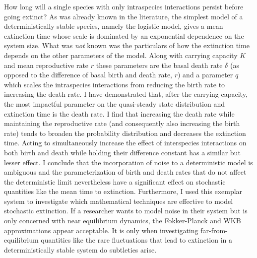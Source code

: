 How long will a single species with only intraspecies interactions persist before going extinct? 
As was already known in the literature, the simplest model of a deterministically stable species, namely the logistic model, gives a mean extinction time whose scale is dominated by an exponential dependence on the system size. 
What was \emph{not} known was the particulars of how the extinction time depends on the other parameters of the model. %
Along with carrying capacity $K$ and mean reproductive rate $r$ these parameters are the basal death rate $\delta$ (as opposed to the difference of basal birth and death rate, $r$) and a parameter $q$ which scales the intraspecies interactions from reducing the birth rate to increasing the death rate. 
I have demonstrated that, after the carrying capacity, the most impactful parameter on the quasi-steady state distribution and extinction time is the death rate. 
I find that increasing the death rate while maintaining the reproductive rate (and consequently also increasing the birth rate) tends to broaden the probability distribution and decreases the extinction time. 
Acting to simultaneously increase the effect of interspecies interactions on both birth and death while holding their difference constant has a similar but lesser effect. 
I conclude that the incorporation of noise to a deterministic model is ambiguous and the parameterization of birth and death rates that do not affect the deterministic limit nevertheless have a significant effect on stochastic quantities like the mean time to extinction. 
Furthermore, I used this exemplar system to investigate which mathematical techniques are effective to model stochastic extinction. 
If a researcher wants to model noise in their system but is only concerned with near equilibrium dynamics, the Fokker-Planck and WKB approximations appear acceptable. 
It is only when investigating far-from-equilibrium quantities like the rare fluctuations that lead to extinction in a deterministically stable system do subtleties arise. 
